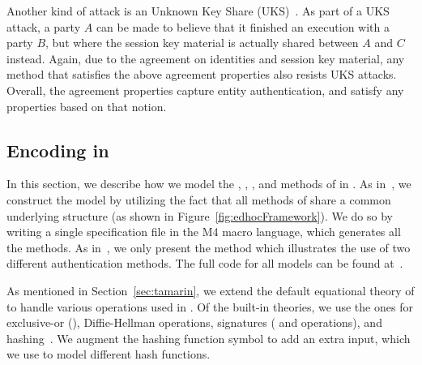 Another kind of attack is an Unknown Key Share (UKS)~\cite{DBLP:conf/ima/Blake-WilsonJM97}.
%
As part of a UKS attack, a party $A$ can be made to believe that it finished an execution with a party $B$, but where the session key material is actually shared between $A$ and $C$ instead.
%
Again, due to the agreement on identities and session key material, any method that satisfies the above agreement properties also resists UKS attacks.
%
Overall, the agreement properties capture entity authentication, and satisfy any properties based on that notion.


\subsection{Encoding \mEdhoc{} in \mTamarin}
\label{sec:modeling}
%
In this section, we describe how we model the \mSigSig, \mSigStat, \mStatSig, and \mStatStat{} methods of \mEdhoc{} in \mTamarin.
%
As in~\cite{Norr21}, we construct the \mTamarin{} model by utilizing the fact that all methods of \mEdhoc{} share a common underlying structure (as shown in Figure~\ref{fig:edhocFramework}).
%
We do so by writing a single specification file in the M4 macro language, which generates all the methods.
%
As in~\cite{Norr21}, we only present the \mStatSig{} method which illustrates the use of two different authentication methods.
%
The full \mTamarin{} code for all models can be found at~\cite{edhocTamarinRepo}.
%

As mentioned in Section~\ref{sec:tamarin}, we extend the default equational theory of \mTamarin{} to handle various operations used in \mEdhoc.
%
Of the built-in theories, we use the ones for exclusive-or (\mXor), Diffie-Hellman operations, signatures ( and  operations), and hashing~\cite{DBLP:conf/csfw/DreierHRS18,DBLP:conf/csfw/SchmidtMCB12}.
%
We augment the hashing function symbol to add an extra input, which we use to model different hash functions.
%

